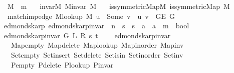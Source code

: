 \begin{isabellebody}
\ \ \ M\ {\isacharcolon}{\kern0pt}{\isacharcolon}{\kern0pt}\ {\isacharprime}{\kern0pt}m\isanewline
\ \ \ invar{\isacharunderscore}{\kern0pt}M{\isacharcolon}{\kern0pt}\ {\isachardoublequoteopen}M{\isachardot}{\kern0pt}invar\ M{\isachardoublequoteclose}\isanewline
\ \ \ is{\isacharunderscore}{\kern0pt}symmetric{\isacharunderscore}{\kern0pt}Map{\isacharunderscore}{\kern0pt}M{\isacharcolon}{\kern0pt}\ {\isachardoublequoteopen}is{\isacharunderscore}{\kern0pt}symmetric{\isacharunderscore}{\kern0pt}Map\ M{\isachardoublequoteclose}\isanewline
\ \ \ match{\isacharunderscore}{\kern0pt}imp{\isacharunderscore}{\kern0pt}edge{\isacharcolon}{\kern0pt}\ {\isachardoublequoteopen}M{\isacharunderscore}{\kern0pt}lookup\ M\ u\ {\isacharequal}{\kern0pt}\ Some\ v\ {\isasymLongrightarrow}\ {\isacharbraceleft}{\kern0pt}u{\isacharcomma}{\kern0pt}\ v{\isacharbraceright}{\kern0pt}\ {\isasymin}\ G{\isachardot}{\kern0pt}E\ G{\isachardoublequoteclose}\isanewline
%
\isadeliminvisible
\isanewline
%
\endisadeliminvisible
%
\isataginvisible
{}\isamarkupfalse%
\ {\isacharparenleft}{\kern0pt}\ edmonds{\isacharunderscore}{\kern0pt}karp{\isacharparenright}{\kern0pt}\ edmonds{\isacharunderscore}{\kern0pt}karp{\isacharunderscore}{\kern0pt}invar{\isacharprime}{\kern0pt}\ {\isacharcolon}{\kern0pt}{\isacharcolon}{\kern0pt}\ {\isachardoublequoteopen}{\isacharprime}{\kern0pt}n\ {\isasymRightarrow}\ {\isacharprime}{\kern0pt}s\ {\isasymRightarrow}\ {\isacharprime}{\kern0pt}s\ {\isasymRightarrow}\ {\isacharprime}{\kern0pt}a\ {\isasymRightarrow}\ {\isacharprime}{\kern0pt}a\ {\isasymRightarrow}\ {\isacharprime}{\kern0pt}m\ {\isasymRightarrow}\ bool{\isachardoublequoteclose}\ \isanewline
\ \ {\isachardoublequoteopen}edmonds{\isacharunderscore}{\kern0pt}karp{\isacharunderscore}{\kern0pt}invar{\isacharprime}{\kern0pt}\ G\ L\ R\ s\ t\ {\isasymequiv}\isanewline
\ \ \ edmonds{\isacharunderscore}{\kern0pt}karp{\isacharunderscore}{\kern0pt}invar\isanewline
\ \ \ \ Map{\isacharunderscore}{\kern0pt}empty\ Map{\isacharunderscore}{\kern0pt}delete\ Map{\isacharunderscore}{\kern0pt}lookup\ Map{\isacharunderscore}{\kern0pt}inorder\ Map{\isacharunderscore}{\kern0pt}inv\isanewline
\ \ \ \ Set{\isacharunderscore}{\kern0pt}empty\ Set{\isacharunderscore}{\kern0pt}insert\ Set{\isacharunderscore}{\kern0pt}delete\ Set{\isacharunderscore}{\kern0pt}isin\ Set{\isacharunderscore}{\kern0pt}inorder\ Set{\isacharunderscore}{\kern0pt}inv\isanewline
\ \ \ \ P{\isacharunderscore}{\kern0pt}empty\ P{\isacharunderscore}{\kern0pt}delete\ P{\isacharunderscore}{\kern0pt}lookup\ P{\isacharunderscore}{\kern0pt}invar\isanewline

\end{isabellebody}
